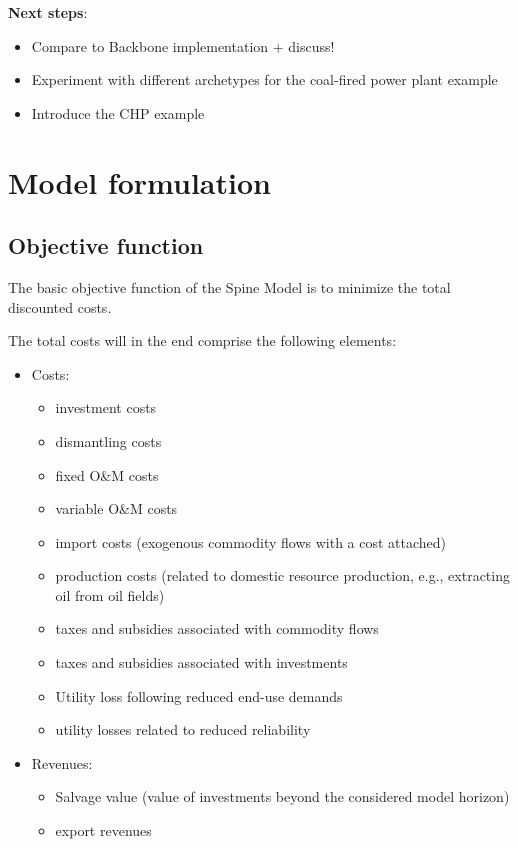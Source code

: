\documentclass[10pt,english]{article}
\begin{document}
\textbf{Next steps}:
\begin{itemize}
\item Compare to Backbone implementation + discuss!
\item Experiment with different archetypes for the coal-fired power plant example
\item Introduce the CHP example
\end{itemize}



\clearpage
\tableofcontents


\clearpage







\section{Model formulation}

\subsection{Objective function}

The basic objective function of the Spine Model is to minimize the total discounted costs. 


The total costs will in the end comprise the following elements:
\begin{itemize}
	\item Costs:
	\begin{itemize}
		\item investment costs
		\item dismantling costs
		\item fixed O\&M costs
		\item variable O\&M costs
		\item import costs (exogenous commodity flows with a cost attached)
		\item production costs (related to domestic resource production, e.g., extracting oil from oil fields)
		\item taxes and subsidies associated with commodity flows
		\item taxes and subsidies associated with investments
		\item Utility loss following reduced end-use demands
		\item utility losses related to reduced reliability
	\end{itemize}
	\item Revenues:
	\begin{itemize}
		\item Salvage value (value of investments beyond the considered model horizon)
		\item export revenues
	\end{itemize}
\end{itemize}
\end{document}
